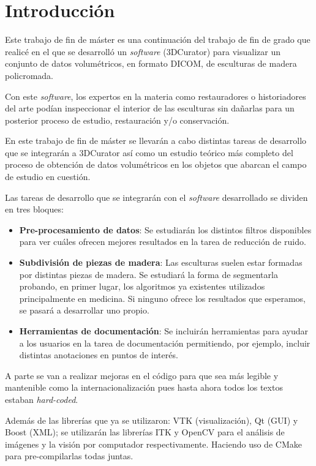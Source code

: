 \chapter{Introducción}

Este trabajo de fin de máster es una continuación del trabajo de fin de grado que realicé en el que se desarrolló un \textit{software} (3DCurator) para visualizar un conjunto de datos volumétricos, en formato DICOM, de esculturas de madera policromada.

Con este \textit{software}, los expertos en la materia como restauradores o historiadores del arte podían inspeccionar el interior de las esculturas sin dañarlas para un posterior proceso de estudio, restauración y/o conservación.

En este trabajo de fin de máster se llevarán a cabo distintas tareas de desarrollo que se integrarán a 3DCurator así como un estudio teórico más completo del proceso de obtención de datos volumétricos en los objetos que abarcan el campo de estudio en cuestión.

Las tareas de desarrollo que se integrarán con el \textit{software} desarrollado se dividen en tres bloques:

\begin{itemize}
	\item \textbf{Pre-procesamiento de datos}: Se estudiarán los distintos filtros disponibles para ver cuáles ofrecen mejores resultados en la tarea de reducción de ruido.
	\item \textbf{Subdivisión de piezas de madera}: Las esculturas suelen estar formadas por distintas piezas de madera. Se estudiará la forma de segmentarla probando, en primer lugar, los algoritmos ya existentes utilizados principalmente en medicina. Si ninguno ofrece los resultados que esperamos, se pasará a desarrollar uno propio.
	\item \textbf{Herramientas de documentación}: Se incluirán herramientas para ayudar a los usuarios en la tarea de documentación permitiendo, por ejemplo, incluir distintas anotaciones en puntos de interés.
\end{itemize}

A parte se van a realizar mejoras en el código para que sea más legible y mantenible como la internacionalización pues hasta ahora todos los textos estaban \textit{hard-coded}.

Además de las librerías que ya se utilizaron: VTK \cite{vtk} (visualización), Qt \cite{qt} (GUI) y Boost \cite{boost} (XML); se utilizarán las librerías ITK \cite{itk} y OpenCV \cite{opencv} para el análisis de imágenes y la visión por computador respectivamente. Haciendo uso de CMake \cite{cmake} para pre-compilarlas todas juntas.

